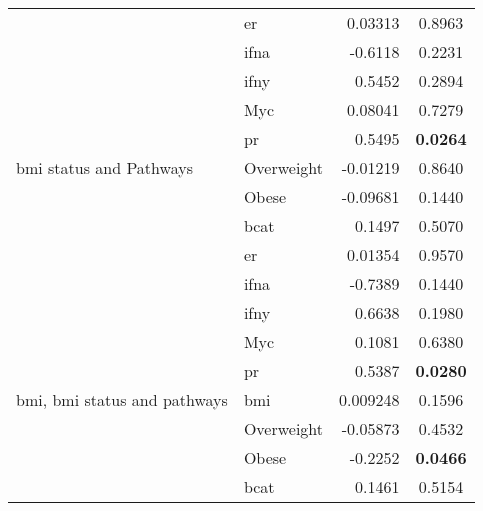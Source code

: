 \begin{table}[htpb]
\begin{threeparttable}
\begin{tabular}{llrc}
                                                                           & \gls{er}   & 0.03313    & 0.8963 \\
                                                                           & \gls{ifna} & -0.6118    & 0.2231 \\
                                                                           & \gls{ifny} & 0.5452     & 0.2894 \\
                                                                           & Myc        & 0.08041    & 0.7279 \\
                                                                           & \gls{pr}   & 0.5495     & \bfseries 0.0264  \\
				\hline
				\rule{0pt}{2.25ex}\gls{bmi} status and Pathways            & Overweight & -0.01219   & 0.8640 \\
                                                                           & Obese      & -0.09681   & 0.1440 \\
                                                                           & \gls{bcat} & 0.1497     & 0.5070 \\
                                                                           & \gls{er}   & 0.01354    & 0.9570 \\
                                                                           & \gls{ifna} & -0.7389    & 0.1440 \\
                                                                           & \gls{ifny} & 0.6638     & 0.1980 \\
                                                                           & Myc        & 0.1081     & 0.6380 \\
                                                                           & \gls{pr}   & 0.5387     & \bfseries 0.0280  \\
				\hline
				\rule{0pt}{2.25ex}\gls{bmi}, \gls{bmi} status and pathways & \gls{bmi}  & 0.009248   & 0.1596 \\
                                                                           & Overweight & -0.05873   & 0.4532 \\
                                                                           & Obese      & -0.2252    & \bfseries 0.0466  \\
                                                                           & \gls{bcat} & 0.1461     & 0.5154 \\

\end{tabular}
\end{threeparttable}
\end{table}
